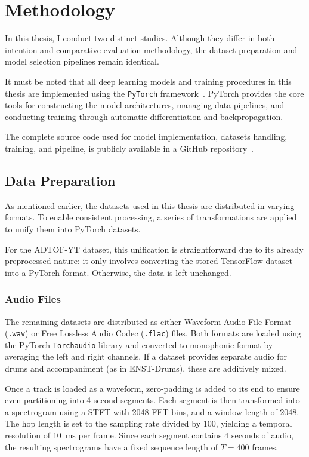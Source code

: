 \chapter{Methodology}\label{Methodology}

In this thesis, I conduct two distinct studies. Although they differ in both intention and comparative evaluation methodology, the dataset preparation and model selection pipelines remain identical.

It must be noted that all deep learning models and training procedures in this thesis are implemented using the \texttt{PyTorch} framework~\cite{paszke2019pytorch}. PyTorch provides the core tools for constructing the model architectures, managing data pipelines, and conducting training through automatic differentiation and backpropagation.

The complete source code used for model implementation, datasets handling, training, and pipeline, is publicly available in a GitHub repository~\cite{fosse2025}.

\section{Data Preparation}

As mentioned earlier, the datasets used in this thesis are distributed in varying formats. To enable consistent processing, a series of transformations are applied to unify them into PyTorch datasets.

For the ADTOF-YT dataset, this unification is straightforward due to its already preprocessed nature: it only involves converting the stored TensorFlow dataset into a PyTorch format. Otherwise, the data is left unchanged.

\subsection{Audio Files}

The remaining datasets are distributed as either Waveform Audio File Format (\texttt{.wav}) or Free Lossless Audio Codec (\texttt{.flac}) files. Both formats are loaded using the PyTorch \texttt{Torchaudio} library and converted to monophonic format by averaging the left and right channels. If a dataset provides separate audio for drums and accompaniment (as in ENST-Drums), these are additively mixed.

Once a track is loaded as a waveform, zero-padding is added to its end to ensure even partitioning into 4-second segments. Each segment is then transformed into a spectrogram using a \acrfull{STFT} with 2048 FFT bins, and a window length of 2048. The hop length is set to the sampling rate divided by 100, yielding a temporal resolution of 10~ms per frame. Since each segment contains 4 seconds of audio, the resulting spectrograms have a fixed sequence length of $T = 400$ frames.


